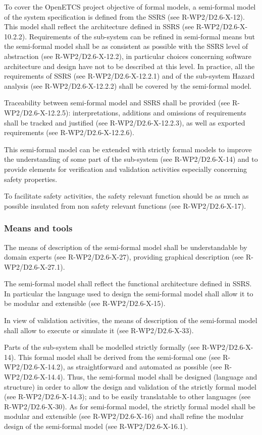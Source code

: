 To cover the OpenETCS project objective  of formal models, a semi-formal model of the system  specification is defined from  the SSRS (see R-WP2/D2.6-X-12). This model shall reflect the architecture defined in SSRS (see R-WP2/D2.6-X-10.2.2). Requirements of the sub-system can be refined in semi-formal means but the semi-formal model  shall be as consistent as possible with the SSRS level of abstraction (see R-WP2/D2.6-X-12.2), in particular choices concerning software architecture and design have not to be described at this level.
In practice, all the requirements of SSRS (see R-WP2/D2.6-X-12.2.1) and of the sub-system Hazard analysis (see R-WP2/D2.6-X-12.2.2) shall be covered by the semi-formal model.

Traceability between semi-formal model and SSRS shall be provided (see R-WP2/D2.6-X-12.2.5): interpretations, additions and omissions of requirements shall be tracked and justified (see R-WP2/D2.6-X-12.2.3), as well as exported requirements  (see R-WP2/D2.6-X-12.2.6).

This semi-formal model can be extended with strictly formal models to improve the understanding of some part of the sub-system (see R-WP2/D2.6-X-14) and to  provide elements for verification and validation activities especially concerning safety properties.

To facilitate safety activities, the safety relevant function should be as much as possible insulated from non safety relevant functions (see R-WP2/D2.6-X-17).


\subsubsection{Means and tools}

The means of description of the semi-formal model shall be understandable by domain experts (see R-WP2/D2.6-X-27), providing graphical  description (see R-WP2/D2.6-X-27.1).

The semi-formal model shall reflect the functional architecture defined in SSRS. In particular the language used to  design the semi-formal model shall allow it to be modular and extensible (see R-WP2/D2.6-X-15).

In view of validation activities, the means of description of the semi-formal model shall allow to execute or simulate it (see R-WP2/D2.6-X-33).

Parts of the sub-system shall be modelled strictly formally (see R-WP2/D2.6-X-14). This formal model shall be derived from the semi-formal one (see R-WP2/D2.6-X-14.2), as straightforward and automated as possible (see R-WP2/D2.6-X-14.4). Thus, the semi-formal model shall be designed (language and structure) in order to allow the design and validation of the strictly formal model (see R-WP2/D2.6-X-14.3); and to be easily translatable to other languages (see R-WP2/D2.6-X-30).
As for semi-formal model, the strictly formal model shall be modular and extensible (see R-WP2/D2.6-X-16) and shall refine the modular design of the semi-formal model (see R-WP2/D2.6-X-16.1).


